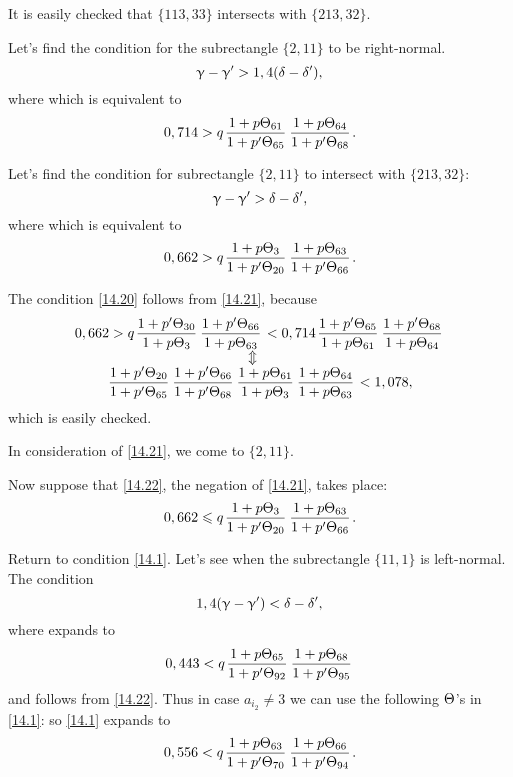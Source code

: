 It is easily checked that $\{113, 33\}$ intersects with $\{213, 32\}$.

Let's find the condition for the subrectangle $\{2, 11\}$ to be right-normal.
\begin{equation*}
	\upgamma - \upgamma' > 1,4 (\delta - \delta'),
\end{equation*}
where
which is equivalent to
\begin{equation}\label{14.20}
	0,714 > q \up{61}{65} \up{64}{68}.
\end{equation}

Let's find the condition for subrectangle $\{2, 11\}$ to intersect with $\{213, 32\}$:
\begin{equation*}
	\upgamma - \upgamma' > \delta - \delta',
\end{equation*}
where
which is equivalent to
\begin{equation}\label{14.21}
	0,662 > q \up{3}{20} \up{63}{66}.
\end{equation}

The condition \ref{14.20} follows from \ref{14.21}, because
\begin{gather*}
	0,662 > q \pu{30}{3} \pu{66}{63} < 0,714 \pu{65}{61} \pu{68}{64}\\
	\ArrowBetweenLines
	\pp{20}{65} \pp{66}{68} \uu{61}{3} \uu{64}{63} < 1,078,
\end{gather*}
which is easily checked.

In consideration of \ref{14.21}, we come to $\{2,11\}$.

Now suppose that \ref{14.22}, the negation of \ref{14.21}, takes place:
\begin{equation}\label{14.22}
	0,662 \leqslant q \up{3}{20} \up{63}{66}.
\end{equation}

Return to condition \ref{14.1}.
Let's see when the subrectangle $\{11, 1\}$ is left-normal.
The condition
\begin{equation*}
	1,4 (\upgamma - \upgamma') < \delta - \delta',
\end{equation*}
where
expands to
\begin{equation*}
	0,443 < q \up{65}{92} \up{68}{95}
\end{equation*}
and follows from \ref{14.22}.
Thus in case $a_{i_2} \ne 3$ we can use the following $\Theta$'s in \ref{14.1}:
so \ref{14.1} expands to
\begin{equation}\label{14.23}
	0,556 < q \up{63}{70} \up{66}{94}.
\end{equation}

